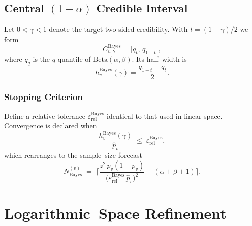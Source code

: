 \subsection{Central $(1-\alpha)$ Credible Interval}

Let $0<\gamma<1$ denote the target two-sided credibility.   With $t=(1-\gamma)/2$ we form
\[
  C^{\mathrm{Bayes}}_{v,\gamma}=\bigl[q_t,\,q_{1-t}\bigr],
\]
where $q_q$ is the $q$-quantile of $\mathrm{Beta}(\alpha,\beta)$.  Its half--width is
\[
  h_v^{\mathrm{Bayes}}(\gamma)=\frac{q_{1-t}-q_t}{2}.
\]

\subsubsection{Stopping Criterion}

Define a relative tolerance $\varepsilon_{\mathrm{rel}}^{\mathrm{Bayes}}$ identical to that used in linear space.  Convergence is declared when
\begin{equation}
  \frac{h_v^{\mathrm{Bayes}}(\gamma)}{\widehat{p}_v} \;\le\; \varepsilon_{\mathrm{rel}}^{\mathrm{Bayes}},
  \label{eq:bayes_conv}
\end{equation}
which rearranges to the sample--size forecast
\begin{equation}
  N_{\mathrm{Bayes}}^{(v)} \;=\;\biggl\lceil \frac{z^{2}\,p_v(1-p_v)}{\bigl(\varepsilon_{\mathrm{rel}}^{\mathrm{Bayes}}\,\widehat{p}_v\bigr)^{2}} - (\alpha+\beta+1) \biggr\rceil.
  \label{eq:trials_required_bayes}
\end{equation}

\section{Logarithmic--Space Refinement}
\label{subsec:log_margin}

